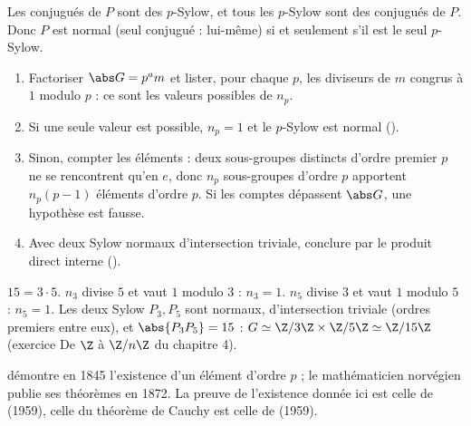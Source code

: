 \begin{preuve}
Les conjugués de $P$ sont des $p$-Sylow, et tous les $p$-Sylow sont des conjugués de $P$. Donc $P$ est normal (seul conjugué : lui-même) si et seulement s'il est le seul $p$-Sylow.
\end{preuve}
\begin{methode}
\begin{enumerate}
\item Factoriser $\abs G=p^am$ et lister, pour chaque $p$, les diviseurs de $m$ congrus à $1$ modulo $p$ : ce sont les valeurs possibles de $n_p$.
\item Si une seule valeur est possible, $n_p=1$ et le $p$-Sylow est normal ().
\item Sinon, compter les éléments : deux sous-groupes distincts d'ordre premier $p$ ne se rencontrent qu'en $e$, donc $n_p$ sous-groupes d'ordre $p$ apportent $n_p(p-1)$ éléments d'ordre $p$. Si les comptes dépassent $\abs G$, une hypothèse est fausse.
\item Avec deux Sylow normaux d'intersection triviale, conclure par le produit direct interne ().
\end{enumerate}
\end{methode}
\begin{exemple}
$15=3\cdot5$. $n_3$ divise $5$ et vaut $1$ modulo $3$ : $n_3=1$. $n_5$ divise $3$ et vaut $1$ modulo $5$ : $n_5=1$. Les deux Sylow $P_3,P_5$ sont normaux, d'intersection triviale (ordres premiers entre eux), et $\abs{P_3P_5}=15$ : $G\simeq\Z/3\Z\times\Z/5\Z\simeq\Z/15\Z$ (exercice \og De $\Z$ à $\Z/n\Z$ \fg{} du chapitre 4).
\end{exemple}
\begin{histoire}
 démontre en 1845 l'existence d'un élément d'ordre $p$ ; le mathématicien norvégien  publie ses théorèmes en 1872. La preuve de l'existence donnée ici est celle de  (1959), celle du théorème de Cauchy est celle de  (1959).
\end{histoire}

